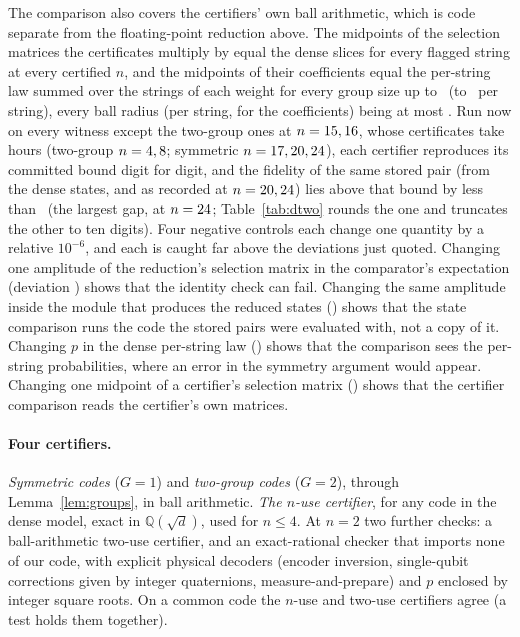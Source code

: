 \documentclass[aps,pra,twocolumn,superscriptaddress,nofootinbib,longbibliography,floatfix]{revtex4-2}
\begin{document}
The comparison also covers the certifiers' own ball arithmetic, which is code separate from the floating-point reduction above. The midpoints of the selection matrices the certificates multiply by equal the dense slices for every flagged string at every certified $n$, and the midpoints of their coefficients equal the per-string law summed over the strings of each weight for every group size up to \SymCertN\ (to \RedCoeffDev\ per string), every ball radius (per string, for the coefficients) being at most \RedRadius. Run now on every witness except the two-group ones at $n=15,16$, whose certificates take hours (two-group $n=4,8$; symmetric $n=17,20,24$), each certifier reproduces its committed bound digit for digit, and the fidelity of the same stored pair (from the dense states, and as recorded at $n=20,24$) lies above that bound by less than \RedEtoEMax\ (the largest gap, at $n=24$; Table~\ref{tab:dtwo} rounds the one and truncates the other to ten digits). Four negative controls each change one quantity by a relative $10^{-6}$, and each is caught far above the deviations just quoted. Changing one amplitude of the reduction's selection matrix in the comparator's expectation (deviation \RedCtlExpect) shows that the identity check can fail. Changing the same amplitude inside the module that produces the reduced states (\RedCtlModule) shows that the state comparison runs the code the stored pairs were evaluated with, not a copy of it. Changing $p$ in the dense per-string law (\RedCtlFlip) shows that the comparison sees the per-string probabilities, where an error in the symmetry argument would appear. Changing one midpoint of a certifier's selection matrix (\RedCtlCert) shows that the certifier comparison reads the certifier's own matrices.

\paragraph*{Four certifiers.} \emph{Symmetric codes} ($G=1$) and \emph{two-group codes} ($G=2$), through Lemma~\ref{lem:groups}, in ball arithmetic. \emph{The $n$-use certifier}, for any code in the dense model, exact in $\mathbb Q(\sqrt d)$, used for $n\le4$. At $n=2$ two further checks: a ball-arithmetic two-use certifier, and an exact-rational checker that imports none of our code, with explicit physical decoders (encoder inversion, single-qubit corrections given by integer quaternions, measure-and-prepare) and $p$ enclosed by integer square roots. On a common code the $n$-use and two-use certifiers agree (a test holds them together).
\end{document}

